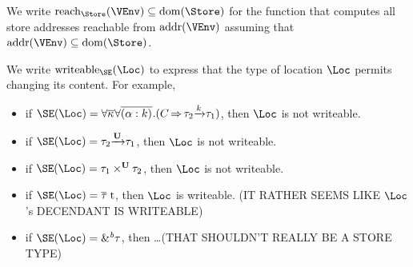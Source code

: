 We write $\Reach\Store\VEnv \subseteq \Dom\Store$ for the function
that computes all store addresses reachable from $\Addresses\VEnv$
assuming that $\Addresses\VEnv \subseteq \Dom\Store$. 

We write $\Writeable\SE\Loc$ to express that the type of location
$\Loc$ permits changing its content. For example,
\begin{itemize}
\item if $\SE (\Loc) =
  \forall\Multi\kvar\forall\Multi{\bvar{\alpha}{k}}.(\qual{C}{\tau_2\tarr{k}\tau_1})$,
  then $\Loc$ is not writeable.
\item if $\SE (\Loc) = \tau_2\tarr{\kun}{\tau_1}$, then $\Loc$ is not
  writeable.
\item if $\SE (\Loc) = \tyPair[\kun]{\tau_1}{\tau_2}$, then $\Loc$ is not writeable.
\item if $\SE (\Loc) = \tapp{t}{\Multi\tau}$, then $\Loc$ is
  writeable. (IT RATHER SEEMS LIKE $\Loc$'s DECENDANT IS WRITEABLE)
\item if $\SE (\Loc) = \borrow\tau$, then \dots (THAT SHOULDN'T REALLY
  BE A STORE TYPE)
\end{itemize}

